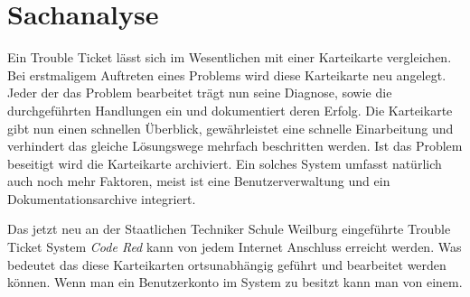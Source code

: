 \chapter{Sachanalyse}  %
\label{chapter:Sachanalyse}  %

Ein Trouble Ticket lässt sich im Wesentlichen mit einer Karteikarte vergleichen. Bei erstmaligem Auftreten eines Problems wird diese Karteikarte neu angelegt. Jeder der das Problem bearbeitet trägt nun seine Diagnose, sowie die durchgeführten Handlungen ein und dokumentiert deren Erfolg. Die Karteikarte gibt nun einen schnellen Überblick, gewährleistet eine schnelle Einarbeitung und verhindert das gleiche Lösungswege mehrfach beschritten werden. Ist das Problem beseitigt wird die Karteikarte archiviert.
Ein solches System umfasst natürlich auch noch mehr Faktoren, meist ist eine Benutzerverwaltung und ein Dokumentationsarchive integriert.

Das jetzt neu an der Staatlichen Techniker Schule Weilburg eingeführte Trouble Ticket System \textit{Code Red} kann von jedem Internet Anschluss erreicht werden. Was bedeutet das diese Karteikarten ortsunabhängig geführt und bearbeitet werden können. Wenn man ein Benutzerkonto im System zu besitzt kann man von einem. 
